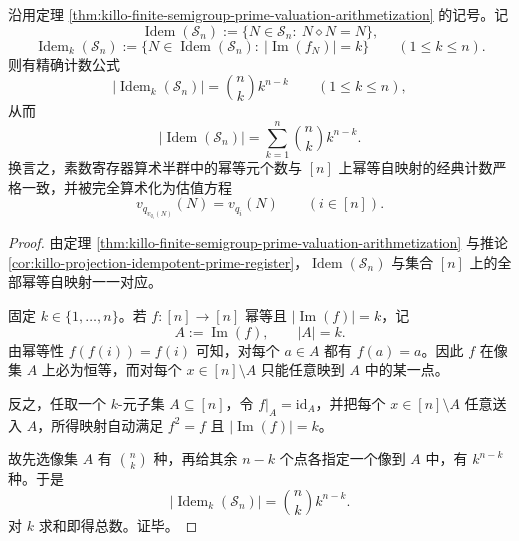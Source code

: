 \begin{theorem}[素数寄存器算术半群的幂等元精确计数]\label{thm:xi-prime-register-idempotent-exact-count}
沿用定理 \ref{thm:killo-finite-semigroup-prime-valuation-arithmetization} 的记号。记
\[
\operatorname{Idem}(\mathcal S_n):=\{N\in\mathcal S_n:\ N\diamond N=N\},
\]
\[
\operatorname{Idem}_k(\mathcal S_n):=
\{N\in \operatorname{Idem}(\mathcal S_n):\ |\operatorname{Im}(f_N)|=k\}
\qquad (1\le k\le n).
\]
则有精确计数公式
\[
\boxed{\;
\bigl|\operatorname{Idem}_k(\mathcal S_n)\bigr|=\binom{n}{k}k^{n-k}
\qquad (1\le k\le n),
\;}
\]
从而
\[
\boxed{\;
\bigl|\operatorname{Idem}(\mathcal S_n)\bigr|
=
\sum_{k=1}^{n}\binom{n}{k}k^{n-k}.
\;}
\]
换言之，素数寄存器算术半群中的幂等元个数与 \([n]\) 上幂等自映射的经典计数严格一致，并被完全算术化为估值方程
\[
v_{q_{v_{q_i}(N)}}(N)=v_{q_i}(N)\qquad (i\in[n]).
\]
\end{theorem}
\begin{proof}
由定理 \ref{thm:killo-finite-semigroup-prime-valuation-arithmetization} 与推论 \ref{cor:killo-projection-idempotent-prime-register}，\(\operatorname{Idem}(\mathcal S_n)\) 与集合 \([n]\) 上的全部幂等自映射一一对应。

固定 \(k\in\{1,\dots,n\}\)。若 \(f:[n]\to[n]\) 幂等且 \(|\operatorname{Im}(f)|=k\)，记
\[
A:=\operatorname{Im}(f),\qquad |A|=k.
\]
由幂等性 \(f(f(i))=f(i)\) 可知，对每个 \(a\in A\) 都有 \(f(a)=a\)。因此 \(f\) 在像集 \(A\) 上必为恒等，而对每个 \(x\in[n]\setminus A\) 只能任意映到 \(A\) 中的某一点。

反之，任取一个 \(k\)-元子集 \(A\subseteq[n]\)，令 \(f|_A=\mathrm{id}_A\)，并把每个 \(x\in[n]\setminus A\) 任意送入 \(A\)，所得映射自动满足 \(f^2=f\) 且 \(|\operatorname{Im}(f)|=k\)。

故先选像集 \(A\) 有 \(\binom{n}{k}\) 种，再给其余 \(n-k\) 个点各指定一个像到 \(A\) 中，有 \(k^{n-k}\) 种。于是
\[
\bigl|\operatorname{Idem}_k(\mathcal S_n)\bigr|=\binom{n}{k}k^{n-k}.
\]
对 \(k\) 求和即得总数。证毕。
\end{proof}

